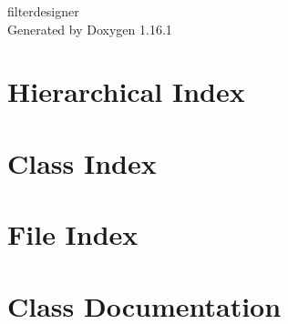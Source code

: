 \documentclass[twoside]{book}
\newcommand{\+}{\discretionary{\mbox{\scriptsize$\hookleftarrow$}}{}{}}
\newcommand{\clearemptydoublepage}{%
    \newpage{\pagestyle{empty}\cleardoublepage}%
  }
\begin{document}
  \raggedbottom
    \hypersetup{pageanchor=false,
                bookmarksnumbered=true,
                pdfencoding=unicode
               }
  \begin{titlepage}
  \vspace*{7cm}
  \begin{center}%
  {\Large filterdesigner}\\
  \vspace*{1cm}
  {\large Generated by Doxygen 1.16.1}\\
  \end{center}
  \end{titlepage}
  \clearemptydoublepage
  \tableofcontents
  \clearemptydoublepage
  \hypersetup{pageanchor=true}
\chapter{Hierarchical Index}

\chapter{Class Index}

\chapter{File Index}

\chapter{Class Documentation}




















\end{document}
